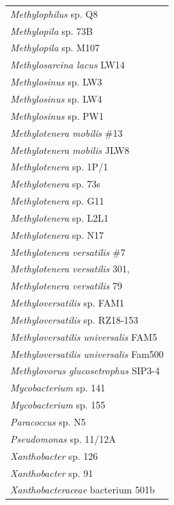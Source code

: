 \begin{singlespace}
\begin{longtable}{p{}}
                 \textit{Methylophilus} sp. Q8 \\
                  \textit{Methylopila} sp. 73B \\
                 \textit{Methylopila} sp. M107 \\
            \textit{Methylosarcina lacus} LW14 \\
                 \textit{Methylosinus} sp. LW3 \\
                 \textit{Methylosinus} sp. LW4 \\
                 \textit{Methylosinus} sp. PW1 \\
            \textit{Methylotenera mobilis} \#13 \\
           \textit{Methylotenera mobilis} JLW8 \\
               \textit{Methylotenera} sp. 1P/1 \\
                \textit{Methylotenera} sp. 73s \\
                \textit{Methylotenera} sp. G11 \\
               \textit{Methylotenera} sp. L2L1 \\
                \textit{Methylotenera} sp. N17 \\
          \textit{Methylotenera versatilis} \#7 \\
        \textit{Methylotenera versatilis} 301, \\
          \textit{Methylotenera versatilis} 79 \\
           \textit{Methyloversatilis} sp. FAM1 \\
       \textit{Methyloversatilis} sp. RZ18-153 \\
   \textit{Methyloversatilis universalis} FAM5 \\
 \textit{Methyloversatilis universalis} Fam500 \\
   \textit{Methylovorus glucosetrophus} SIP3-4 \\
                \textit{Mycobacterium} sp. 141 \\
                \textit{Mycobacterium} sp. 155 \\
                    \textit{Paracoccus} sp. N5 \\
               \textit{Pseudomonas} sp. 11/12A \\
                 \textit{Xanthobacter} sp. 126 \\
                  \textit{Xanthobacter} sp. 91 \\
     \textit{Xanthobacteraceae} bacterium 501b \\
\midrule
\end{longtable}
\end{singlespace}


